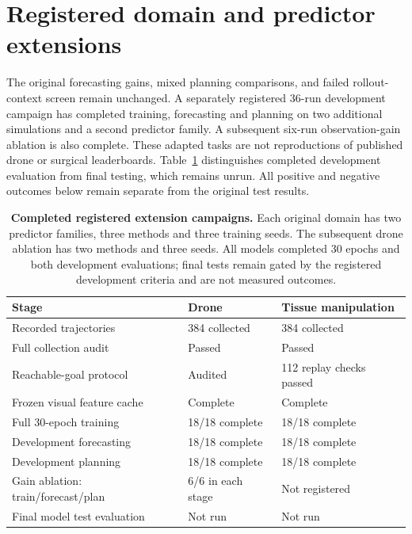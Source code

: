 \FloatBarrier
\section{Registered domain and predictor extensions}
\label{sec:domain-extensions}
The original forecasting gains, mixed planning comparisons, and failed
rollout-context screen remain unchanged. A separately registered 36-run
development campaign has completed training, forecasting and planning on
two additional simulations and a second predictor family. A subsequent
six-run observation-gain ablation is also complete. These adapted tasks
are not reproductions of published drone or surgical leaderboards.
Table~\ref{tab:extension-status} distinguishes completed development
evaluation from final testing, which remains unrun. All positive and
negative outcomes below remain separate from the original test results.

\begin{table}[H]
\centering\small
\setlength{\tabcolsep}{6pt}
\begin{tabular}{p{.42\linewidth}p{.23\linewidth}p{.23\linewidth}}
\toprule
Stage & Drone & Tissue manipulation \\
\midrule
Recorded trajectories & 384 collected & 384 collected \\
Full collection audit & Passed & Passed \\
Reachable-goal protocol & Audited & 112 replay checks passed \\
Frozen visual feature cache & Complete & Complete \\
Full 30-epoch training & 18/18 complete & 18/18 complete \\
Development forecasting & 18/18 complete & 18/18 complete \\
Development planning & 18/18 complete & 18/18 complete \\
Gain ablation: train/forecast/plan & 6/6 in each stage & Not registered \\
Final model test evaluation & Not run & Not run \\
\bottomrule
\end{tabular}
\caption{\textbf{Completed registered extension campaigns.}
Each original domain has two predictor families, three methods and three
training seeds. The subsequent drone ablation has two methods and three
seeds. All models completed 30 epochs and both development evaluations;
final tests remain gated by the registered development criteria and are not measured outcomes.}
\label{tab:extension-status}
\end{table}


